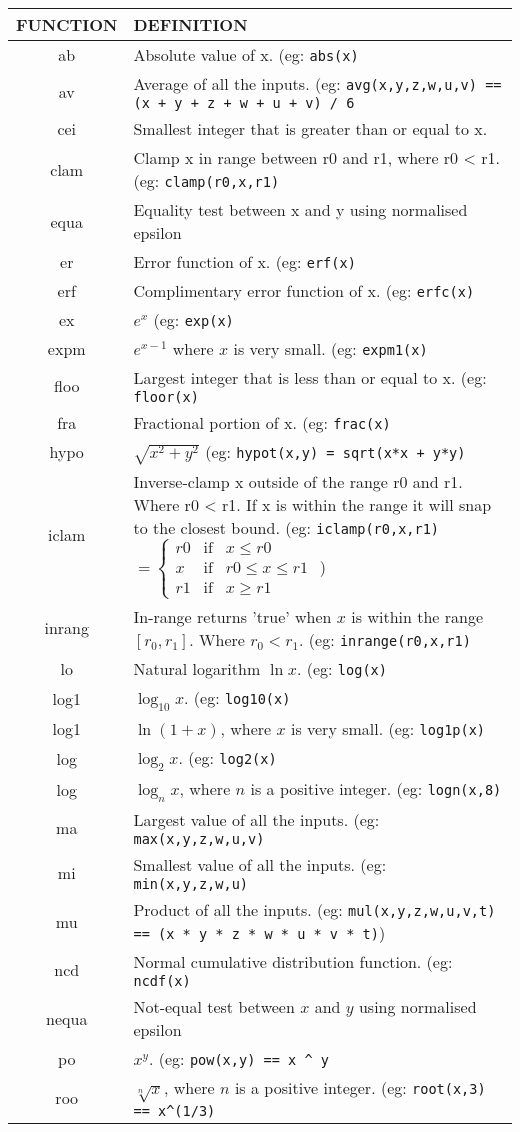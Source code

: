 \begin{tabular}{|c|p{}|}
\hline 
FUNCTION  & DEFINITION\tabularnewline
\hline 
ab & Absolute value of x. (eg: \verb'abs(x)'\tabularnewline
av & Average of all the inputs. (eg: \verb'avg(x,y,z,w,u,v) == (x + y + z + w + u + v) / 6'\tabularnewline
cei & Smallest integer that is greater than or equal to x.\tabularnewline
clam & Clamp x in range between r0 and r1, where r0 \textless{} r1. (eg:
\verb'clamp(r0,x,r1)'\tabularnewline
equa & Equality test between x and y using normalised epsilon\tabularnewline
er & Error function of x. (eg: \verb'erf(x)'\tabularnewline
erf & Complimentary error function of x. (eg: \verb'erfc(x)'\tabularnewline
ex & $e^{x}$ (eg: \verb'exp(x)'\tabularnewline
expm & $e^{x-1}$ where $x$ is very small. (eg: \verb'expm1(x)'\tabularnewline
floo & Largest integer that is less than or equal to x. (eg: \verb'floor(x)'\tabularnewline
fra & Fractional portion of x. (eg: \verb'frac(x)'\tabularnewline
hypo & $\sqrt{x^{2}+y^{2}}$ (eg: \verb'hypot(x,y) = sqrt(x*x + y*y)'\tabularnewline
iclam & Inverse-clamp x outside of the range r0 and r1. Where r0 \textless{}
r1. If x is within the range it will snap to the closest bound. (eg:
\verb'iclamp(r0,x,r1)' $=\left\{ \begin{array}{ccc}
r0 & \mathrm{if} & x\le r0\\
x & \mathrm{if} & r0\le x\le r1\\
r1 & \mathrm{if} & x\ge r1
\end{array}\right.$ )\tabularnewline
inrang & In-range returns 'true' when $x$ is within the range $[r_{0},r_{1}]$.
Where $r_{0}<r_{1}$. (eg: \verb'inrange(r0,x,r1)'\tabularnewline
lo & Natural logarithm $\ln x$. (eg: \verb'log(x)'\tabularnewline
log1 & $\log_{10}x$. (eg: \verb'log10(x)'\tabularnewline
log1 & $\ln(1+x)$, where $x$ is very small. (eg: \verb'log1p(x)'\tabularnewline
log & $\log_{2}x$. (eg: \verb'log2(x)'\tabularnewline
log & $\log_{n}x$, where $n$ is a positive integer. (eg: \verb'logn(x,8)'\tabularnewline
ma & Largest value of all the inputs. (eg: \verb'max(x,y,z,w,u,v)'\tabularnewline
mi & Smallest value of all the inputs. (eg: \verb'min(x,y,z,w,u)'\tabularnewline
mu & Product of all the inputs. (eg: \verb'mul(x,y,z,w,u,v,t) == (x * y * z * w * u * v * t)')\tabularnewline
ncd & Normal cumulative distribution function. (eg: \verb'ncdf(x)'\tabularnewline
nequa & Not-equal test between $x$ and $y$ using normalised epsilon\tabularnewline
po & $x^{y}$. (eg: \verb'pow(x,y) == x ^ y'\tabularnewline
roo & $\sqrt[n]{x}$, where $n$ is a positive integer. (eg: \verb'root(x,3) == x^(1/3)'\tabularnewline

\end{tabular}
